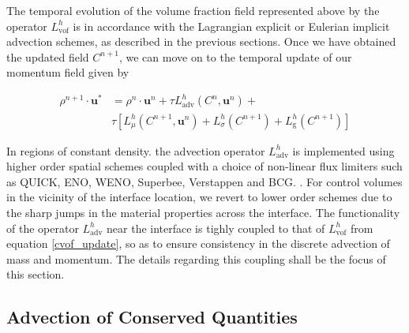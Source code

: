 
The temporal evolution of the volume fraction field represented above by the 
operator $L^{h}_{\textrm{vof}}$ is in accordance with the Lagrangian explicit or Eulerian implicit 
advection schemes, as described in the previous sections. 
Once we have obtained the updated field $C^{n+1}$, we can move on to 
the temporal update of our momentum field given by 

\begin{align}
	\rho^{n+1}\cdot \boldsymbol{u}^{*} &= \rho^{n}\cdot \boldsymbol{u}^{n} + \tau L^{h}_{\textrm{adv}}\left( C^{n},\boldsymbol{u}^{n} \right) + \nonumber \\
				      & \tau \left[ L^{h}_{\mu}\left(C^{n+1},\boldsymbol{u}^{n}\right) + L^{h}_{\sigma}\left(C^{n+1}\right) + L^{h}_{\textrm{g}}\left(C^{n+1}\right)\right]
\label{mom_update}
\end{align}

In regions of constant density. the advection operator $L^{h}_{\textrm{adv}}$ 
is implemented using higher order spatial schemes 
coupled with a choice of non-linear flux limiters such as 
QUICK, ENO, WENO, Superbee, Verstappen and BCG.
. 
For control volumes in the vicinity of the interface location, we revert to lower order 
schemes due to the sharp jumps in the material properties across the interface.  
The functionality of the operator $L^{h}_{\textrm{adv}}$ near the interface is tighly coupled
to that of $L^{h}_{\textrm{vof}}$ from equation \ref{cvof_update}, 
so as to ensure consistency in the discrete advection of mass and momentum.
The details regarding this coupling shall be the focus of this section. 

\subsection*{Advection of Conserved Quantities}

\newcommand{\dert}[1]{\frac{\partial #1}{\partial t}}
\newcommand{\cijk}{C_{i,j,k}}
\newcommand{\pijk}{\phi_{i,j,k}}
\newcommand{\X}{\boldsymbol{x}}
\newcommand{\N}{\boldsymbol{n}}
\newcommand{\rijk}{\rho_{i,j,k}}
\newcommand\mijk{(\rho u_{q})_{i,j,k}}

